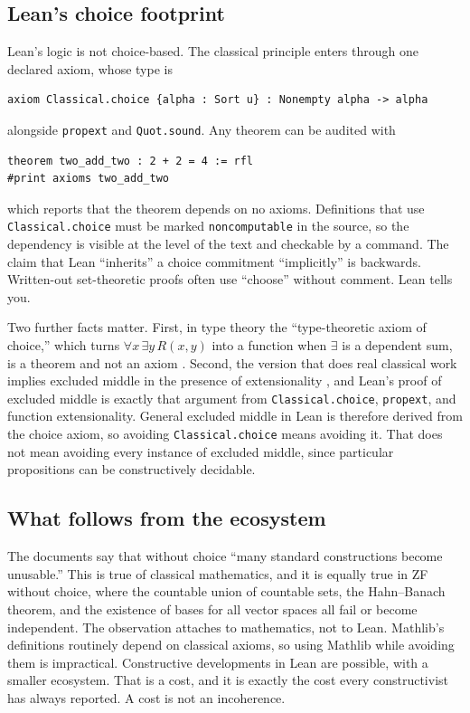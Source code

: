 \documentclass[11pt]{article}
\begin{document}
\subsection{Lean's choice footprint}

Lean's logic is not choice-based. The classical principle enters through one declared axiom, whose type is
\begin{lstlisting}
axiom Classical.choice {alpha : Sort u} : Nonempty alpha -> alpha
\end{lstlisting}
alongside \texttt{propext} and \texttt{Quot.sound}. Any theorem can be audited with
\begin{lstlisting}
theorem two_add_two : 2 + 2 = 4 := rfl
#print axioms two_add_two
\end{lstlisting}
which reports that the theorem depends on no axioms. Definitions that use \texttt{Classical.choice} must be marked \texttt{noncomputable} in the source, so the dependency is visible at the level of the text and checkable by a command. The claim that Lean ``inherits'' a choice commitment ``implicitly'' is backwards. Written-out set-theoretic proofs often use ``choose'' without comment. Lean tells you.

Two further facts matter. First, in type theory the ``type-theoretic axiom of choice,'' which turns $\forall x\,\exists y\,R(x,y)$ into a function when $\exists$ is a dependent sum, is a theorem and not an axiom \cite{martinlof1984}. Second, the version that does real classical work implies excluded middle in the presence of extensionality \cite{diaconescu1975,goodman1978}, and Lean's proof of excluded middle is exactly that argument from \texttt{Classical.choice}, \texttt{propext}, and function extensionality. General excluded middle in Lean is therefore derived from the choice axiom, so avoiding \texttt{Classical.choice} means avoiding it. That does not mean avoiding every instance of excluded middle, since particular propositions can be constructively decidable.

\subsection{What follows from the ecosystem}

The documents say that without choice ``many standard constructions become unusable.'' This is true of classical mathematics, and it is equally true in ZF without choice, where the countable union of countable sets, the Hahn--Banach theorem, and the existence of bases for all vector spaces all fail or become independent. The observation attaches to mathematics, not to Lean. Mathlib's definitions routinely depend on classical axioms, so using Mathlib while avoiding them is impractical. Constructive developments in Lean are possible, with a smaller ecosystem. That is a cost, and it is exactly the cost every constructivist has always reported. A cost is not an incoherence.
\end{document}
